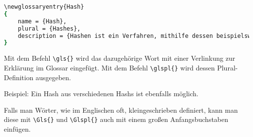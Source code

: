 \begin{lstlisting}[caption=Beispiel einer Glossar-Definition, label=lst:glossary_def, language=bash]
\newglossaryentry{Hash}
{
    name = {Hash},
    plural = {Hashes},
    description = {Hashen ist ein Verfahren, mithilfe dessen beispielsweise ein Passwort in einen nicht zurueckkonvertierbaren Text veraendert werden kann. So koennen Daten, welche nur zum Vergleich benutzt werden, sicherer gespeichert werden.}
}
\end{lstlisting}

Mit dem Befehl \texttt{\textbackslash{}gls\{\}} wird das dazugehörige Wort mit einer Verlinkung zur Erklärung im Glossar eingefügt. Mit dem Befehl \texttt{\textbackslash{}glspl\{\}} wird dessen Plural-Definition ausgegeben.

Beispiel: Ein \gls{Hash} aus verschiedenen \glspl{Hash} ist ebenfalls möglich.

Falls man Wörter, wie im Englischen oft, kleingeschrieben definiert, kann man diese mit \texttt{\textbackslash{}Gls\{\}} und \texttt{\textbackslash{}Glspl\{\}} auch mit einem großen Anfangsbuchstaben einfügen.